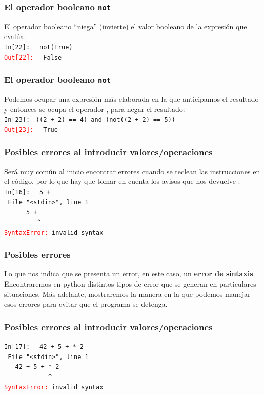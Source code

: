\documentclass[12pt]{beamer}
\begin{document}
\begin{frame}[fragile]
\frametitle{El operador booleano \texttt{not}}
El operador booleano  \enquote{niega} (invierte) el valor booleano de la expresión que evalúa:
\\
\bigskip
\pause
\textcolor{ao}{\texttt{In[22]: }} \verb| not(True)| \\
\pause
\textcolor{red}{\texttt{Out[22]: }} \verb| False|
\end{frame}
\begin{frame}[fragile]
\frametitle{El operador booleano \texttt{not}}
Podemos ocupar una expresión más elaborada en la que anticipamos el resultado y entonces se ocupa el operador , para negar el resultado:
\\
\bigskip
\pause
{\fontsize{12}{12}\selectfont
\textcolor{ao}{\texttt{In[23]: }} \verb|((2 + 2) == 4) and (not((2 + 2) == 5))|} \\
\pause
\textcolor{red}{\texttt{Out[23]: }} \verb| True|
\end{frame}
\begin{frame}[fragile]
\frametitle{Posibles errores al introducir valores/operaciones}
Será muy común al inicio encontrar errores cuando se teclean las instrucciones en el código, por lo que hay que tomar en cuenta los avisos que nos devuelve \python:
\\
\bigskip
\pause
\textcolor{ao}{\texttt{In[16]: }} \verb| 5 + | \\
\pause
\verb| File "<stdin>", line 1| \\
\verb|      5 +  | \\
\verb|         ^| \\
\textcolor{red}{\texttt{SyntaxError:}}\verb| invalid syntax|
\end{frame}
\begin{frame}
\frametitle{Posibles errores}
Lo que nos indica que se presenta un error, en este caso, un \textbf{error de sintaxis}.
\\
\bigskip
\pause
Encontraremos en python distintos tipos de error que se generan en particulares situaciones. \pause Más adelante, mostraremos la manera en la que podemos manejar esos errores para evitar que el programa se detenga.
\end{frame}
\begin{frame}[fragile]
\frametitle{Posibles errores al introducir valores/operaciones}
\textcolor{ao}{\texttt{In[17]: }} \verb| 42 + 5 + * 2 | \\
\pause
\verb| File "<stdin>", line 1| \\
\verb|   42 + 5 + * 2 | \\
\verb|            ^| \\
\textcolor{red}{\texttt{SyntaxError:}}\verb| invalid syntax|
\end{frame}
\end{document}
